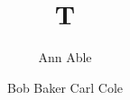 \documentclass{article}
\usepackage{neurips_2022}
\title{T}
\author{Ann Able \and Bob Baker \NewAnd Carl Cole}

\maketitle
Body.


